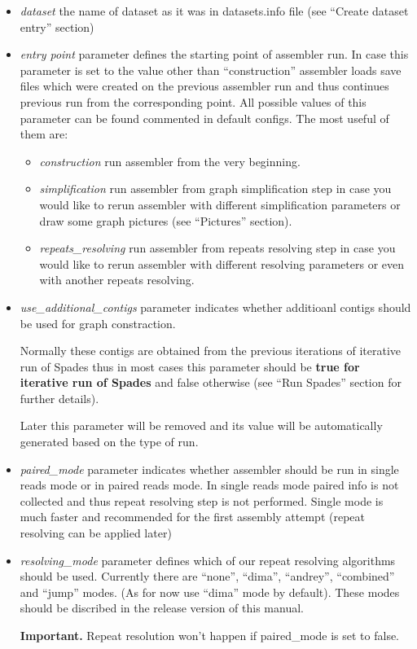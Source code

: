 \documentclass{article}
\begin{document}
\begin{itemize}
\item {\it dataset} the name of dataset as it was in datasets.info file (see ``Create dataset entry'' section)
\item {\it entry point} parameter defines the starting point of assembler run.
In case this parameter is set to the value other than ``construction'' assembler loads save files which were created on the previous assembler run and thus continues previous run from the corresponding point.
All possible values of this parameter can be found commented in default configs.
The most useful of them are:
\begin{itemize}
\item {\it construction} run assembler from the very beginning.
\item {\it simplification} run assembler from graph simplification step in case you would like to rerun assembler with different simplification parameters or draw some graph pictures (see ``Pictures'' section).
\item {\it repeats\_resolving} run assembler from repeats resolving step in case you would like to rerun assembler with different resolving parameters or even with another repeats resolving.
\end{itemize}
\item {\it use\_additional\_contigs} parameter indicates whether additioanl contigs should be used for graph constraction.

Normally these contigs are obtained from the previous iterations of iterative run of Spades thus 
in most cases this parameter should be \textbf{true for iterative run of Spades} 
and false otherwise (see ``Run Spades'' section for further details).

Later this parameter will be removed and its value will be automatically generated based on the type of run.
\item {\it paired\_mode} parameter indicates whether assembler should be run in single reads mode or in paired reads mode. 
In single reads mode paired info is not collected and thus repeat resolving step is not performed. Single mode is much faster and recommended
for the first assembly attempt (repeat resolving can be applied later)
\item {\it resolving\_mode} parameter defines which of our repeat resolving algorithms should be used.
Currently there are ``none'', ``dima'', ``andrey'', ``combined'' and ``jump'' modes. (As for now use ``dima'' mode by default).
These modes should be discribed in the release version of this manual. 

\textbf{Important.} Repeat resolution won't happen if paired\_mode is set to false.
\end{itemize}
\end{document}
